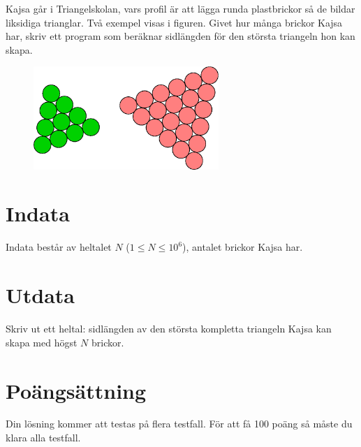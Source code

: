 
Kajsa går i Triangelskolan, vars profil är att lägga runda plastbrickor så de bildar liksidiga
trianglar. Två exempel visas i figuren. Givet hur många brickor Kajsa har, skriv ett program
som beräknar sidlängden för den största triangeln hon kan skapa.
\begin{figure}[ht!]
\centering
\includegraphics[width=7cm]{triangel.png}
\caption{}
\label{fig1}
\end{figure}

\section*{Indata}
Indata består av heltalet $N$ ($1 \leq N \leq 10^6$), antalet brickor Kajsa har.

\section*{Utdata}
Skriv ut ett heltal: sidlängden av den största kompletta triangeln Kajsa kan skapa med högst $N$ brickor.

\section*{Poängsättning}
Din lösning kommer att testas på flera testfall. För att få 100 poäng så måste du klara alla testfall.
